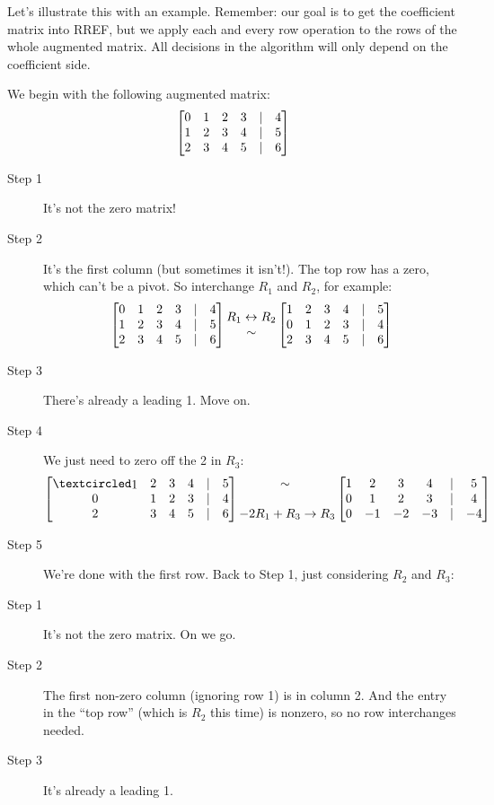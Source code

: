 Let's illustrate this with an example. Remember: our goal is to get the coefficient matrix into RREF, but we apply each and every row operation to the rows of the whole augmented matrix. All decisions in the algorithm will only depend on the coefficient side.

\begin{myexample} We begin with the following augmented matrix: 
$$
\left[ \begin{matrix} 0 & 1 & 2 & 3&|& 4\\
1 & 2 & 3 & 4 &|& 5\\
2 & 3 & 4 & 5 & |& 6 \end{matrix} \right]
$$
\begin{description}
\item[Step 1]  It's not the zero matrix!

\item[Step 2]   It's the first column (but sometimes it isn't!).  
The top row has a zero, which can't be a pivot.  So 
interchange $R_1$ and $R_2$, for example:
$$\left[ \begin{matrix} 0 & 1 & 2 & 3&|& 4\\
1 & 2 & 3 & 4 &|& 5\\
2 & 3 & 4 & 5 & |& 6 \end{matrix} \right]
\begin{matrix} R_1 \leftrightarrow R_2 \\ \sim \end{matrix}
\left[ \begin{matrix} 
1 & 2 & 3 & 4 &|& 5\\
0 & 1 & 2 & 3 &|& 4\\
2 & 3 & 4 & 5 & |& 6 \end{matrix} \right]
$$
\item[Step 3] There's already a leading 1. Move on.

\item[Step 4] We just need to zero off the 2 in $R_3$:
$$\mat{
\pivot & 2 & 3 & 4 &|& 5\\
0 & 1 & 2 & 3 &|& 4\\
2 & 3 & 4 & 5 & |& 6}
\mt{\sim\ \\ \\ -2R_1+R_3\to R_3}
\mat{
1 & 2 & 3 & 4 &|& 5\\
0 & 1 & 2 & 3 &|& 4\\
0 & -1 & -2 & -3 & |& -4}
$$
\item[Step 5] We're done with the first row.
Back to Step 1, just considering $R_2$ and $R_3$:

\item[Step 1]  It's not the zero matrix. On we go.

\item[Step 2] The first non-zero column (ignoring row 1) is in column 2.  And the entry in the ``top row'' (which is $R_2$ this time) is nonzero, so no row interchanges needed.

\item[Step 3]  It's already a leading 1.


\end{description}
\end{myexample}
